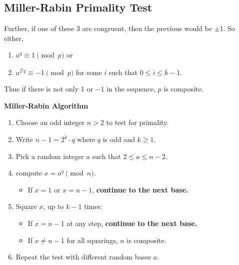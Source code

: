 \subsection{Miller-Rabin Primality Test}

 Further, if one of these 3 are congruent, then the previous would be \(\pm 1\). So either,
\begin{enumerate}[label=(\roman*)]
    \item \(a^q \equiv 1 \pmod{p}\) or
    \item \(a^{2^iq} \equiv -1 \pmod{p}\) for some \(i\) such that \(0 \leq i \leq k-1\).
\end{enumerate} Thus if there is not only 1 or \(-1\) in the sequence, \(p\) is composite.

\begin{center}
    \textbf{Miller-Rabin Algorithm }    
\end{center}

\begin{enumerate}
    \item Choose an odd integer \(n > 2\) to test for primality.
    \item Write \(n - 1 = 2^k \cdot q\) where \(q\) is odd and \(k \geq 1\). 
    \item Pick a random integer \(a\) such that \(2 \leq a \leq n - 2\).
    \item compute \(x = a^q \pmod{n}\).
    \begin{itemize}
        \item If \(x = 1\) or \(x = n - 1\), \textbf{continue to the next base.}
    \end{itemize}
    \item Square \(x\), up to \(k - 1\) times:
    \begin{itemize}
        \item If \(x = n - 1\) at any step, \textbf{continue to the next base.}
        \item If \(x \ne n - 1\) for all squarings, \(n\) is composite.
    \end{itemize}
    \item Repeat the test with different random bases \(a\).
\end{enumerate}

